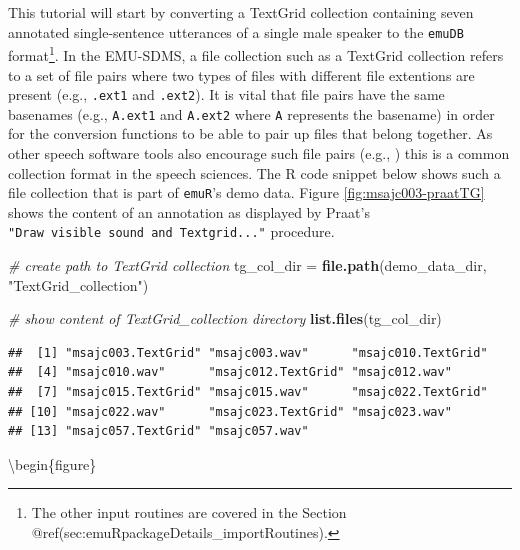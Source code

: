 \documentclass[]{book}
\newenvironment{Shaded}{\begin{snugshade}}{\end{snugshade}}
\newcommand{\CommentTok}[1]{\textcolor[rgb]{0.56,0.35,0.01}{\textit{#1}}}
\newcommand{\KeywordTok}[1]{\textcolor[rgb]{0.13,0.29,0.53}{\textbf{#1}}}
\newcommand{\NormalTok}[1]{#1}
\newcommand{\StringTok}[1]{\textcolor[rgb]{0.31,0.60,0.02}{#1}}
\let\rmarkdownfootnote\footnote%
\def\footnote{\protect\rmarkdownfootnote}
\theoremstyle{definition}
\theoremstyle{definition}
\theoremstyle{definition}
\theoremstyle{remark}
\begin{document}
This tutorial will start by converting a TextGrid collection containing
seven annotated single-sentence utterances of a single male speaker to
the \texttt{emuDB} format\footnote{The other input routines are covered
  in the Section @ref(sec:emuRpackageDetails\_importRoutines).}. In the
EMU-SDMS, a file collection such as a TextGrid collection refers to a
set of file pairs where two types of files with different file
extentions are present (e.g., \texttt{.ext1} and \texttt{.ext2}). It is
vital that file pairs have the same basenames (e.g., \texttt{A.ext1} and
\texttt{A.ext2} where \texttt{A} represents the basename) in order for
the conversion functions to be able to pair up files that belong
together. As other speech software tools also encourage such file pairs
(e.g., \citet{kisler:2015a}) this is a common collection format in the
speech sciences. The R code snippet below shows such a file collection
that is part of \texttt{emuR}'s demo data. Figure
\ref{fig:msajc003-praatTG} shows the content of an annotation as
displayed by Praat's \texttt{"Draw\ visible\ sound\ and\ Textgrid..."}
procedure.

\begin{Shaded}
\begin{Highlighting}[]
\CommentTok{# create path to TextGrid collection}
\NormalTok{tg_col_dir =}\StringTok{ }\KeywordTok{file.path}\NormalTok{(demo_data_dir, }\StringTok{"TextGrid_collection"}\NormalTok{)}

\CommentTok{# show content of TextGrid_collection directory}
\KeywordTok{list.files}\NormalTok{(tg_col_dir)}
\end{Highlighting}
\end{Shaded}

\begin{verbatim}
##  [1] "msajc003.TextGrid" "msajc003.wav"      "msajc010.TextGrid"
##  [4] "msajc010.wav"      "msajc012.TextGrid" "msajc012.wav"     
##  [7] "msajc015.TextGrid" "msajc015.wav"      "msajc022.TextGrid"
## [10] "msajc022.wav"      "msajc023.TextGrid" "msajc023.wav"     
## [13] "msajc057.TextGrid" "msajc057.wav"
\end{verbatim}

\textbackslash{}begin\{figure\}
\end{document}
